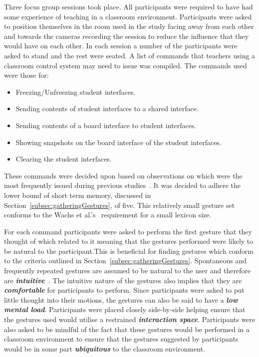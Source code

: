 \documentclass[link]{IWCOMP}
\begin{document}
Three focus group sessions took place.
All participants were required to have had some experience of teaching in a classroom environment.
Participants were asked to position themselves in the room used in the study facing away from each other and towards the cameras recording the session to reduce the influence that they would have on each other.
In each session a number of the participants were asked to stand and the rest were seated.
A list of commands that teachers using a classroom control system may need to issue was compiled.
The commands used were those for: 
\begin{itemize}
\item Freezing/Unfreezing student interfaces.
\item Sending contents of student interfaces to a shared interface.
\item Sending contents of a board interface to student interfaces.
\item Showing snapshots on the board interface of the student interfaces.
\item Clearing the student interfaces.\\
\end{itemize}

These commands were decided upon based on observations on which were the most frequently issued during previous studies~\citep{Hatch2011}.
It was decided to adhere the lower bound of short term memory, discussed in Section~\ref{subsec:gatheringGestures}, of five.
This relatively small gesture set conforms to the Wachs et al.'s~\citeyearpar{Wachs2011} requirement for a small lexicon size.

For each command participants were asked to perform the first gesture that they thought of which related to it meaning  that the gestures performed were likely to be natural to the participant.This is beneficial for finding gestures which conform to the criteria outlined in Section~\ref{subsec:gatheringGestures}.
Spontaneous and frequently repeated gestures are assumed to be natural to the user and therefore are \textit{\textbf{intuitive}}~\citep{Grandhi2011}.
The intuitive nature of the gestures also implies that they are \textit{\textbf{comfortable}} for participants to perform.
Since participants were asked to put little thought into their motions, the gestures can also be said to have a \textit{\textbf{low mental load}}.
Participants were placed closely side-by-side helping ensure that the gestures used would utilise a restrained \textit{\textbf{interaction space}}.
Participants were also asked to be mindful of the fact that these gestures would be performed in a classroom environment to ensure that the gestures suggested by participants would be in some part \textit{\textbf{ubiquitous}} to the classroom environment.
\end{document}
